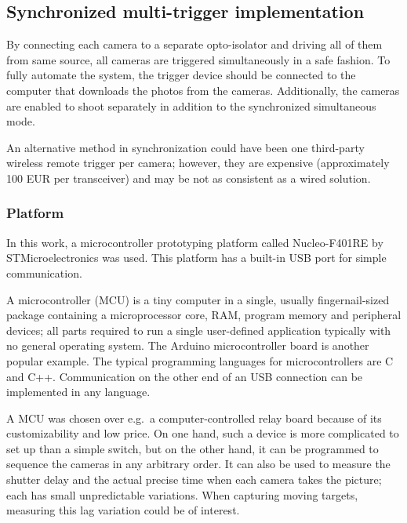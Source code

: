

\subsection{Synchronized multi-trigger implementation} %

By connecting each camera to a separate opto-isolator and driving all of them from same source, all cameras are triggered simultaneously in a safe fashion.
To fully automate the system, the trigger device should be connected to the computer that downloads the photos from the cameras.
Additionally, the cameras are enabled to shoot separately in addition to the synchronized simultaneous mode.

An alternative method in synchronization could have been one third-party wireless remote trigger per camera;
however, they are expensive (approximately 100 EUR per transceiver) and may be not as consistent as a wired solution.

\subsubsection{Platform}

In this work, a microcontroller prototyping platform called Nucleo-F401RE by STMicroelectronics was used.
This platform has a built-in USB port for simple communication.

A microcontroller (MCU) is a tiny computer in a single, usually fingernail-sized package containing a microprocessor core, RAM, program memory and peripheral devices; all parts required to run a single user-defined application typically with no general operating system.
The Arduino microcontroller board is another popular example.
The typical programming languages for microcontrollers are C and C++.
Communication on the other end of an USB connection can be implemented in any language.

A MCU was chosen over e.g.\ a computer-controlled relay board because of its customizability and low price.
On one hand, such a device is more complicated to set up than a simple switch, but on the other hand, it can be programmed to sequence the cameras in any arbitrary order.
It can also be used to measure the shutter delay and the actual precise time when each camera takes the picture; each has small unpredictable variations.
When capturing moving targets, measuring this lag variation could be of interest.

